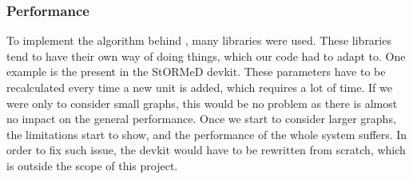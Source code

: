 \subsubsection{Performance}
To implement the algorithm behind \projectName, many libraries were used. These libraries tend to have their own way of doing things, which our code had to adapt to. One example is the  present in the StORMeD devkit. These parameters have to be recalculated every time a new unit is added, which requires a lot of time. If we were only to consider small graphs, this would be no problem as there is almost no impact on the general performance. Once we start to consider larger graphs, the limitations start to show, and the performance of the whole system suffers. In order to fix such issue, the devkit would have to be rewritten from scratch, which is outside the scope of this project. 